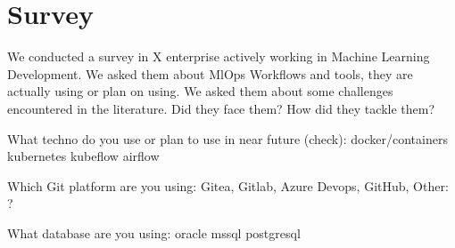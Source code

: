\section{Survey}\label{sec:stsurvey}
We conducted a survey in X enterprise actively working in Machine Learning Development.
We asked them about MlOps Workflows and tools, they are actually using or plan on using.
We asked them about some challenges encountered in the literature.
Did they face them?
How did they tackle them?


What techno do you use or plan to use in near future (check):
    docker/containers
    kubernetes
    kubeflow
    airflow

Which Git platform are you using:
    Gitea, Gitlab, Azure Devops, GitHub, Other: ?

What database are you using:
    oracle
    mssql
    postgresql


